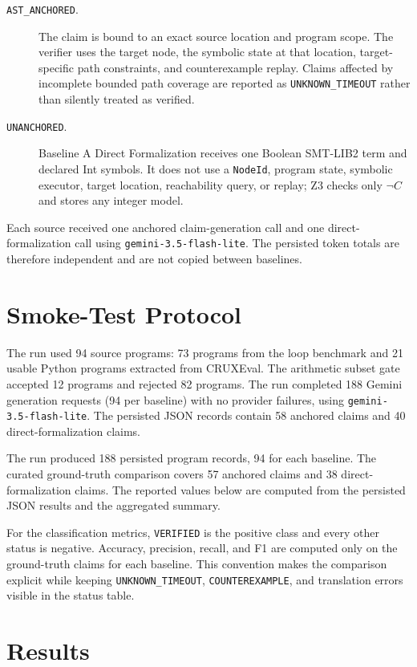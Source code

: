 \documentclass[11pt]{article}
\newcommand{\anchored}{\texttt{AST\_ANCHORED}}
\newcommand{\unanchored}{\texttt{UNANCHORED}}
\begin{document}
\begin{description}
  \item[\anchored.] The claim is bound to an exact source location and
  program scope.  The verifier uses the target node, the symbolic state at
  that location, target-specific path constraints, and counterexample replay.
  Claims affected by incomplete bounded path coverage are reported as
  \texttt{UNKNOWN\_TIMEOUT} rather than silently treated as verified.
  \item[\unanchored.] Baseline A Direct Formalization receives one Boolean
  SMT-LIB2 term and declared Int symbols.  It does not use a \texttt{NodeId},
  program state, symbolic executor, target location, reachability query, or
  replay; Z3 checks only $\neg C$ and stores any integer model.
\end{description}

Each source received one anchored claim-generation call and one
direct-formalization call using \texttt{gemini-3.5-flash-lite}.  The persisted
token totals are therefore independent and are not copied between baselines.

\section{Smoke-Test Protocol}

The run used 94 source programs: 73 programs from the loop benchmark and 21
usable Python programs extracted from CRUXEval.  The arithmetic subset gate
accepted 12 programs and rejected 82 programs.  The run completed 188 Gemini
generation requests (94 per baseline) with no provider failures, using
\texttt{gemini-3.5-flash-lite}.  The persisted JSON records contain 58
anchored claims and 40 direct-formalization claims.

The run produced 188 persisted program records, 94 for each baseline.  The
curated ground-truth comparison covers 57 anchored claims and 38
direct-formalization claims.  The reported values below are computed from the
persisted JSON results and the aggregated summary.

For the classification metrics, \texttt{VERIFIED} is the positive class and
every other status is negative.  Accuracy, precision, recall, and F1 are
computed only on the ground-truth claims for each baseline.  This convention makes the
comparison explicit while keeping \texttt{UNKNOWN\_TIMEOUT},
\texttt{COUNTEREXAMPLE}, and translation errors visible in the status table.

\section{Results}
\end{document}
